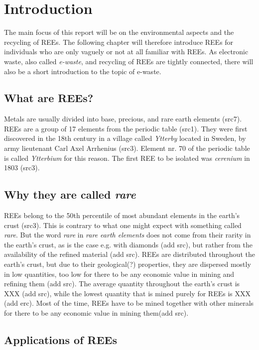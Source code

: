 
\section{Introduction}
The main focus of this report will be on the environmental aspects and the recycling of REEs. The following chapter will therefore introduce REEs for individuals who are only vaguely or not at all familiar with REEs. As electronic waste, also called \textit{e-waste}, and recycling of REEs are tightly connected, there will also be a short introduction to the topic of e-waste. 

\subsection{What are REEs?}

Metals are usually divided into base, precious, and rare earth elements (src7). REEs are a group of 17 elements from the periodic table (src1). They were first discovered in the 18th century in a village called \textit{Ytterby} located in Sweden, by army lieutenant Carl Axel Arrhenius (src3). Element nr. 70 of the periodic table is called \textit{Ytterbium} for this reason. The first REE to be isolated was \textit{cerenium} in 1803 (src3).  

\subsection{Why they are called \textit{rare}}

REEs belong to the 50th percentile of most abundant elements in the earth's crust (src3). This is contrary to what one might expect with something called \textit{rare}. But the word \textit{rare} in \textit{rare earth elements} does not come from their rarity in the earth's crust, as is the case e.g. with diamonds (add src), but rather from the availability of the refined material (add src).  REEs are distributed throughout the earth's crust, but due to their geological(?) properties, they are dispersed mostly in low quantities, too low for there to be any economic value in mining and refining them (add src). The average quantity throughout the earth's crust is XXX (add src), while the lowest quantity that is mined purely for REEs is XXX (add erc). Most of the time, REEs have to be mined together with other minerals for there to be any economic value in mining them(add src). 

\subsection{Applications of REEs}

